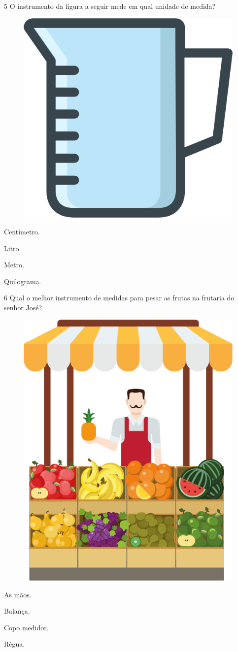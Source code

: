 \num{5} O instrumento da figura a seguir mede em qual unidade de medida?

\begin{figure}[H]
\centering
\includegraphics[width=.3\textwidth]{./media/image153.png}
\end{figure}

\begin{escolha}[itemsep=-5pt]
\item Centímetro.

\item Litro.

\item Metro.

\item Quilograma.
\end{escolha}

\num{6} Qual o melhor instrumento de medidas para pesar as frutas na frutaria do
senhor José?

\begin{figure}[H]
\centering
\includegraphics[width=.3\textwidth]{./media/image154.png}
\end{figure}

\begin{escolha}[itemsep=-5pt]
\item As mãos.

\item Balança.

\item Copo medidor.

\item Régua.
\end{escolha}

